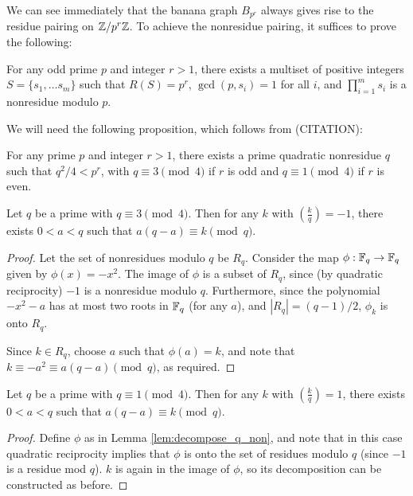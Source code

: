 \documentclass{amsart}
\begin{document}
We can see immediately that the banana graph $B_{p^r}$ always gives
rise to the residue pairing on $\mathbb{Z}/p^r\mathbb{Z}$. To achieve the nonresidue
pairing, it suffices to prove the following:

\begin{claim}
  \label{claim:exist_decomp}
  For any odd prime $p$ and integer $r > 1$, there exists a
  multiset of positive integers $S = \{s_1, \ldots s_m\}$ such that
  $R(S) = p^r$, $\gcd(p, s_i) = 1$ for all $i$, and $\prod_{i=1}^ms_i$
  is a nonresidue modulo $p$.
\end{claim}

We will need the following proposition, which follows from (CITATION):
\begin{prop}
  \label{prop:q_bound}
  For any prime $p$ and integer $r > 1$, there exists a prime
  quadratic nonresidue $q$ such that $q^2/4<p^r$, with $q\equiv 3\pmod
  4$ if $r$ is odd and $q\equiv 1\pmod 4$ if $r$ is even.
\end{prop}

\begin{lem}
  \label{lem:decompose_q_non}
  Let $q$ be a prime with $q \equiv 3 \pmod 4$. Then for any $k$
  with $\left( \frac{k}{q} \right) = -1$, there exists $0 < a < q$
  such that $a(q-a) \equiv k \pmod q$. 
\end{lem}
\begin{proof}
  Let the set of nonresidues modulo $q$ be $R_q$. Consider the map
  $\phi:\mathbb{F}_q \to \mathbb{F}_q$ given by $\phi(x) = -x^2$. The image of
  $\phi$ is a subset of $R_q$, since (by quadratic reciprocity)
  $-1$ is a nonresidue modulo $q$. Furthermore, since the polynomial
  $-x^2 - a$ has at most two roots in $\mathbb{F}_q$ (for any $a$), and
  $|R_q| = (q - 1)/2$, $\phi_k$ is onto $R_q$. 

  Since $k \in R_q$, choose $a$ such that $\phi(a) = k$, and note
  that $k \equiv -a^2 \equiv a(q-a) \pmod q$, as required.
\end{proof}
\begin{lem}
  \label{lem:decompose_q_res}
  Let $q$ be a prime with $q \equiv 1 \pmod 4$. Then for any $k$
  with $\left( \frac{k}{q} \right) = 1$, there exists $0 < a < q$
  such that $a(q-a) \equiv k \pmod q$.
\end{lem}
\begin{proof}
  Define $\phi$ as in Lemma \ref{lem:decompose_q_non}, and note that in
  this case quadratic reciprocity implies that $\phi$ is onto the set
  of residues modulo $q$ (since $-1$ is a residue mod $q$). $k$ is
  again in the image of $\phi$, so its decomposition can be
  constructed as before.
\end{proof}
\end{document}
